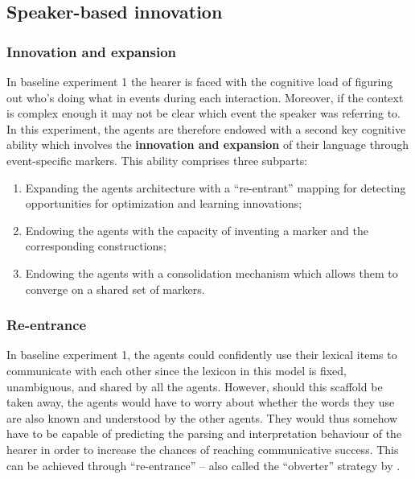 \subsection{Speaker-based innovation}

\subsubsection{Innovation and expansion}

In baseline experiment 1 the hearer is faced with the cognitive load of figuring out who's doing what in events during each interaction. Moreover, if the context is complex enough it may not be clear which event the speaker was referring to. In this experiment, the agents are therefore endowed with a second key cognitive ability which involves the {\bfseries innovation and expansion} of their language through event-specific markers. This ability comprises three subparts:

\begin{enumerate}
\item Expanding the agents architecture with a ``re-entrant'' mapping for detecting opportunities for optimization and learning innovations;
\item Endowing the agents with the capacity of inventing a marker and the corresponding constructions;
\item Endowing the agents with a consolidation mechanism which allows them to converge on a shared set of markers.  
\end{enumerate}

\subsubsection{Re-entrance}
 In baseline experiment 1, the agents could confidently use their lexical items to communicate with each other since the lexicon in this model is fixed, unambiguous, and shared by all the agents. However, should this scaffold be taken away, the agents would have to worry about whether the words they use are also known and understood by the other agents. They would thus somehow have to be capable of predicting the parsing and interpretation behaviour of the hearer in order to increase the chances of reaching communicative success. This can be achieved through ``re-entrance'' 
\citep{steels03language} -- also called the ``obverter'' strategy by \citet{smith03intelligent}.

